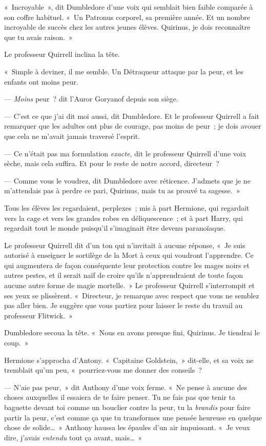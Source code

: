 «~Incroyable~», dit Dumbledore d'une voix qui semblait bien faible comparée à son coffre habituel.
«~Un Patronus corporel, sa première année.
Et un nombre incroyable de succès chez les autres jeunes élèves.
Quirinus, je dois reconnaître que tu avais raison.~»

Le professeur Quirrell inclina la tête.

«~Simple à deviner, il me semble.
Un Détraqueur attaque par la peur, et les enfants ont moins peur.

--- \emph{Moins} peur~? dit l'Auror Goryanof depuis son siège.

--- C'est ce que j'ai dit moi aussi, dit Dumbledore.
Et le professeur Quirrell a fait remarquer que les adultes ont plus de courage, pas moins de peur~; je dois avouer que cela ne m'avait jamais traversé l'esprit.

--- Ce n'était pas ma formulation \emph{exacte}, dit le professeur Quirrell d'une voix sèche, mais cela suffira.
Et pour le reste de notre accord, directeur~?

--- Comme vous le voudrez, dit Dumbledore avec réticence.
J'admets que je ne m'attendais pas à perdre ce pari, Quirinus, mais tu as prouvé ta sagesse.~»

Tous les élèves les regardaient, perplexes~; mis à part Hermione, qui regardait vers la cage et vers les grandes robes en déliquescence~; et à part Harry, qui regardait tout le monde puisqu'il s'imaginait être devenu paranoïaque.

Le professeur Quirrell dit d'un ton qui n'invitait à aucune réponse, «~Je suis autorisé à enseigner le sortilège de la Mort à ceux qui voudront l'apprendre.
Ce qui augmentera de façon conséquente leur protection contre les mages noirs et autres pestes, et il serait naïf de croire qu'ils n'apprendraient de toute façon aucune autre forme de magie mortelle.~»
Le professeur Quirrell s'interrompit et ses yeux se plissèrent.
«~Directeur, je remarque avec respect que vous ne semblez pas aller bien.
Je suggère que vous partiez pour laisser le reste du travail au professeur Flitwick.~»

Dumbledore secoua la tête.
«~Nous en avons presque fini, Quirinus.
Je tiendrai le coup.~»

Hermione s'approcha d'Antony.
«~Capitaine Goldstein,~» dit-elle, et sa voix ne tremblait qu'un peu, «~pourriez-vous me donner des conseils~?

--- N'aie pas peur,~» dit Anthony d'une voix ferme.
«~Ne pense à aucune des choses auxquelles il essaiera de te faire penser.
Tu ne fais pas que tenir ta baguette devant toi comme un bouclier contre la peur, tu la \emph{brandis} pour faire partir la peur, c'est comme ça que tu transformes une pensée heureuse en quelque chose de solide…~»
Anthony haussa les épaules d'un air impuissant.
«~Je veux dire, j'avais \emph{entendu} tout ça avant, mais…~»


